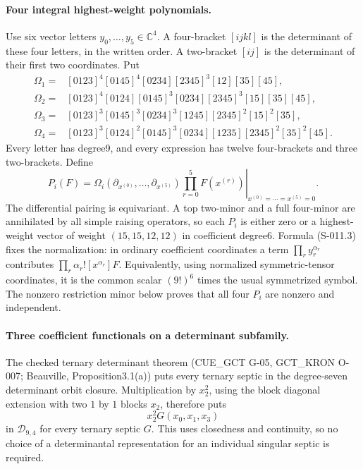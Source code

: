 \paragraph{Four integral highest-weight polynomials.}
Use six vector letters $y_0,\ldots,y_5\in\mathbb C^4$.
A four-bracket $[ijkl]$ is the determinant of these four letters,
in the written order. A two-bracket $[ij]$ is the determinant of
their first two coordinates. Put
\[
\begin{split}
\Omega_1={}&[0123]^4[0145]^4[0234][2345]^3
                         [12][35][45],\\
\Omega_2={}&[0123]^4[0124][0145]^3[0234][2345]^3
                         [15][35][45],\\
\Omega_3={}&[0123]^3[0145]^3[0234]^3[1245][2345]^2
                         [15]^2[35],\\
\Omega_4={}&[0123]^3[0124]^2[0145]^3[0234][1235][2345]^2
                         [35]^2[45].
\end{split}                                                     \tag{S-011.2}
\]
Every letter has degree9, and every expression has twelve
four-brackets and three two-brackets. Define
\[
 P_i(F)=
 \left.
 \Omega_i(\partial_{x^{(0)}},\ldots,\partial_{x^{(5)}})
             \prod_{r=0}^5 F(x^{(r)})
 \right|_{x^{(0)}=\cdots=x^{(5)}=0}.
\tag{S-011.3}
\]
The differential pairing is equivariant. A top two-minor and a full
four-minor are annihilated by all simple raising operators, so each
$P_i$ is either zero or a highest-weight vector of weight
$(15,15,12,12)$ in coefficient degree6. Formula (S-011.3) fixes the
normalization: in ordinary coefficient coordinates a term
$\prod_r y_r^{\alpha_r}$ contributes
$\prod_r\alpha_r![x^{\alpha_r}]F$.
Equivalently, using normalized symmetric-tensor coordinates, it is
the common scalar $(9!)^6$ times the usual symmetrized symbol.
The nonzero restriction minor below proves that all four $P_i$
are nonzero and independent.

\paragraph{Three coefficient functionals on a determinant subfamily.}
The checked ternary determinant theorem (CUE\_GCT G-05,
GCT\_KRON O-007; Beauville, Proposition3.1(a)) puts every ternary
septic in the degree-seven determinant orbit closure.
Multiplication by $x_2^2$, using the block diagonal extension with
two $1$ by $1$ blocks $x_2$, therefore puts
\[
                      x_2^2G(x_0,x_1,x_3)
\tag{S-011.4}
\]
in $\mathcal D_{9,4}$ for every ternary septic $G$.
This uses closedness and continuity, so no choice of a determinantal
representation for an individual singular septic is required.


